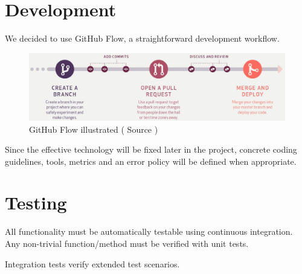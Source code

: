 \section{Development}

We decided to use GitHub Flow\cite{github-flow}, a straightforward development workflow.

\begin{figure}[H]
    \centering
    \includegraphics[width=0.85\linewidth]{resources/github_flow}
    \caption[Organigram]{GitHub Flow illustrated ( Source \cite{github-flow})}
    \label{fig:organigram}
\end{figure}


Since the effective technology will be fixed later in the project, concrete coding guidelines, tools, metrics and an error policy will be defined when appropriate.


\section{Testing}
All functionality must be automatically testable using continuous integration. Any non-trivial function/method must be verified with unit tests.

Integration tests verify extended test scenarios.


\label{lastpage}

\backmatter
{}






\listoffigures %

\listoftables %






